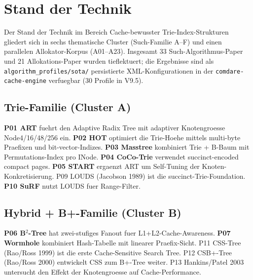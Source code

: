 \chapter{Stand der Technik}\label{ch:sota}


Der Stand der Technik im Bereich Cache-bewusster Trie-Index-Strukturen
gliedert sich in sechs thematische Cluster (Such-Familie A--F) und einen
parallelen Allokator-Korpus (A01--A23). Insgesamt 33 Such-Algorithmus-Paper
und 21 Allokations-Paper wurden tieflektuert; die Ergebnisse sind als
\verb|algorithm_profiles/sota/| persistierte XML-Konfigurationen in der
\texttt{comdare-cache-engine} verfuegbar (30 Profile in V9.5).

\section{Trie-Familie (Cluster A)}

\textbf{P01 ART} \cite{leis2013art} fuehrt den Adaptive Radix Tree mit
adaptiver Knotengroesse Node4/16/48/256 ein.
\textbf{P02 HOT} \cite{binna2018hot} optimiert die Trie-Hoehe mittels
multi-byte Praefixen und bit-vector-Indizes.
\textbf{P03 Masstree} \cite{mao2012masstree} kombiniert Trie + B-Baum mit
Permutations-Index pro INode.
\textbf{P04 CoCo-Trie} \cite{boffa2024coco} verwendet succinct-encoded
compact pages.
\textbf{P05 START} \cite{fent2020start} ergaenzt ART um Self-Tuning der
Knoten-Konkretisierung.
P09 LOUDS (Jacobson 1989) ist die succinct-Trie-Foundation.
\textbf{P10 SuRF} \cite{zhang2018surf} nutzt LOUDS fuer Range-Filter.

\section{Hybrid + B+-Familie (Cluster B)}

\textbf{P06 B$^2$-Tree} \cite{schmeisser2022b2tree} hat zwei-stufiges
Fanout fuer L1+L2-Cache-Awareness.
\textbf{P07 Wormhole} \cite{wu2019wormhole} kombiniert Hash-Tabelle mit
linearer Praefix-Sicht.
P11 CSS-Tree (Rao/Ross 1999) ist die erste Cache-Sensitive Search Tree.
P12 CSB+-Tree (Rao/Ross 2000) entwickelt CSS zum B+-Tree weiter.
P13 Hankins/Patel 2003 untersucht den Effekt der Knotengroesse auf
Cache-Performance.

